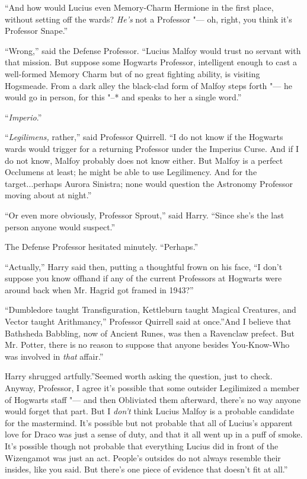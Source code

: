 ``And how would Lucius even Memory-Charm Hermione in the first place,
without setting off the wards? \emph{He's} not a Professor "--- oh, right,
you think it's Professor Snape.''

``Wrong,'' said the Defense Professor. ``Lucius Malfoy would trust no
servant with that mission. But suppose some Hogwarts Professor,
intelligent enough to cast a well-formed Memory Charm but of no great
fighting ability, is visiting Hogsmeade. From a dark alley the
black-clad form of Malfoy steps forth "--- he would go in person, for this
"--* and speaks to her a single word.''

``\emph{Imperio}.''

``\emph{Legilimens,} rather,'' said Professor Quirrell. ``I do not know
if the Hogwarts wards would trigger for a returning Professor under the
Imperius Curse. And if I do not know, Malfoy probably does not know
either. But Malfoy is a perfect Occlumens at least; he might be able to
use Legilimency. And for the target...perhaps Aurora Sinistra; none
would question the Astronomy Professor moving about at night.''

``Or even more obviously, Professor Sprout,'' said Harry. ``Since she's
the last person anyone would suspect.''

The Defense Professor hesitated minutely. ``Perhaps.''

``Actually,'' Harry said then, putting a thoughtful frown on his face,
``I don't suppose you know offhand if any of the current Professors at
Hogwarts were around back when Mr. Hagrid got framed in 1943?''

``Dumbledore taught Transfiguration, Kettleburn taught Magical
Creatures, and Vector taught Arithmancy,'' Professor Quirrell said at
once.''And I believe that Bathsheda Babbling, now of Ancient Runes, was
then a Ravenclaw prefect. But Mr. Potter, there is no reason to suppose
that anyone besides You-Know-Who was involved in \emph{that} affair.''

Harry shrugged artfully.''Seemed worth asking the question, just to
check. Anyway, Professor, I agree it's possible that some outsider
Legilimized a member of Hogwarts staff "--- and then Obliviated them
afterward, there's no way anyone would forget that part. But I
\emph{don't} think Lucius Malfoy is a probable candidate for the
mastermind. It's possible but not probable that all of Lucius's apparent
love for Draco was just a sense of duty, and that it all went up in a
puff of smoke. It's possible though not probable that everything Lucius
did in front of the Wizengamot was just an act. People's outsides do not
always resemble their insides, like you said. But there's one piece of
evidence that doesn't fit at all.''

